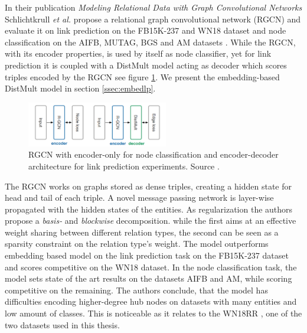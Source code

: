 

In their publication \textit{Modeling Relational Data with Graph Convolutional Networks} Schlichtkrull \textit{et al.} propose a relational graph convolutional network (RGCN) and evaluate it on link prediction on the FB15K-237 and WN18 dataset and node classification on the AIFB, MUTAG, BGS and AM datasets \cite{gangemi_modeling_2018}. While the RGCN, with its encoder properties, is used by itself as node classifier, yet for link prediction it is coupled with a DistMult model acting as decoder which scores triples encoded by the RGCN see figure \ref{fig:RGCN}. We present the embedding-based DistMult model in section \ref{ssec:embedlp}.

\begin{figure}[h]
    \centering
    \includegraphics[width=0.55\textwidth]{data/images/RGCN.png}
    \caption{RGCN with encoder-only for node classification and encoder-decoder architecture for link prediction experiments. Source \cite{gangemi_modeling_2018}.}
    \label{fig:RGCN}
\end{figure}

The RGCN works on graphs stored as dense triples, creating a hidden state for head and tail of each triple. A novel message passing network is layer-wise propagated with the hidden states of the entities. As regularization the authors propose a \textit{basis-} and \textit{blockwise} decomposition. while the first  aims at an effective weight sharing between different relation types, the second  can be seen as a sparsity constraint on the relation type's weight. The model outperforms embedding based model on the link prediction task on the FB15K-237 dataset and scores competitive on the WN18 dataset. In the node classification task, the model sets state of the art results on the datasets AIFB and AM, while scoring competitive on the remaining. The authors conclude, that the model has difficulties encoding higher-degree hub nodes on datasets with many entities and low amount of classes. This is noticeable as it relates to the WN18RR \cite{battaglia_relational_2018}, one of the two datasets used in this thesis.  


